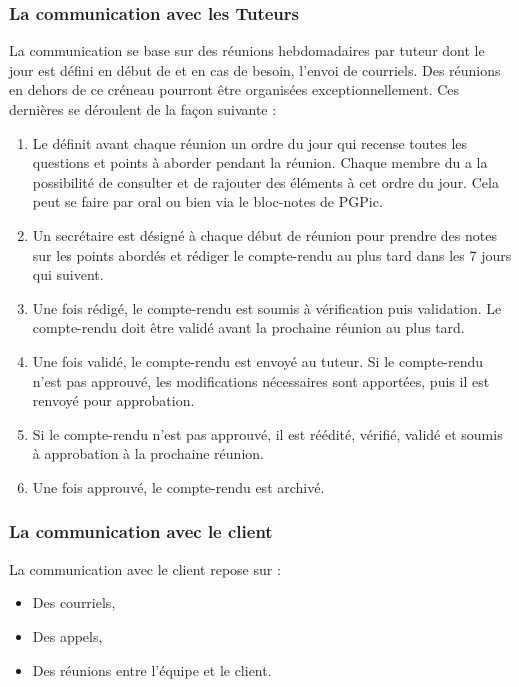 \subsubsection*{La communication avec les Tuteurs}
La communication se base sur des réunions hebdomadaires par tuteur dont le jour est défini en début de \PICCourt et en cas de besoin, l’envoi de courriels. Des réunions en dehors de ce créneau pourront être organisées exceptionnellement. Ces dernières se déroulent de la façon suivante :
\begin{enumerate}
\item Le \CP{} définit avant chaque réunion un ordre du jour qui recense toutes les questions et points à aborder pendant la réunion. Chaque membre du \PICCourt{} a la possibilité de consulter et de rajouter des éléments à cet ordre du jour. Cela peut se faire par oral ou bien via le bloc-notes de PGPic. 
\item Un secrétaire est désigné à chaque début de réunion pour prendre des notes sur les points abordés et rédiger le compte-rendu au plus tard dans les 7 jours qui suivent.
\item Une fois rédigé, le compte-rendu est soumis à vérification puis validation. Le compte-rendu doit être validé avant la prochaine réunion au plus tard.
\item Une fois validé, le compte-rendu est envoyé au tuteur. Si le compte-rendu n’est pas approuvé, les modifications nécessaires sont apportées, puis il est renvoyé pour approbation.
\item Si le compte-rendu n’est pas approuvé, il est réédité, vérifié, validé et soumis à approbation à la prochaine réunion.
\item Une fois approuvé, le compte-rendu est archivé. 
\end{enumerate}

\subsubsection*{La communication avec le client}

La communication avec le client repose sur : 
\begin{itemize}
\item Des courriels,
\item Des appels,
\item Des réunions entre l'équipe et le client. \\
\end{itemize}

